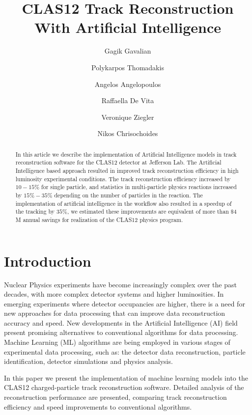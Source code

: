 \documentclass[preprint,12pt]{elsarticle}
\title{CLAS12 Track Reconstruction With Artificial Intelligence }
\author[1]{Gagik Gavalian}
\author[2]{Polykarpos Thomadakis}
\author[2]{Angelos Angelopoulos}
\author[3]{Raffaella De Vita}
\author[1]{Veronique Ziegler}
\author[2]{Nikos Chrisochoides}
\begin{document}
\begin{abstract}

  In this article we describe the implementation of Artificial Intelligence models in track reconstruction software for the CLAS12 detector at Jefferson Lab.
 The Artificial Intelligence based approach resulted in improved track reconstruction efficiency in high luminosity experimental conditions.  The track
 reconstruction efficiency increased by $10-15\%$ for single particle, and statistics in multi-particle physics reactions increased by $15\%-35\%$ depending 
 on the number of particles in the reaction. The implementation of artificial intelligence in the workflow also resulted in a speedup of the tracking by $35\%$, 
 we estimated these improvements are equivalent of more than $\$4$M  annual savings for realization of the CLAS12 physics program.
\end{abstract}
\maketitle


\section{Introduction}
\indent

Nuclear Physics experiments have become increasingly complex over the past decades, with more complex detector systems and higher luminosities. In emerging experiments where detector occupancies are higher, there is a need for new approaches for data processing that can improve data reconstruction accuracy and speed. New developments in the Artificial Intelligence (AI) field present promising alternatives to conventional algorithms for data processing. Machine Learning (ML) algorithms are being employed in various stages of experimental data processing, such as: the detector data reconstruction, particle identification, detector simulations and physics analysis. 

In this paper we present the implementation of machine learning models into the CLAS12 charged-particle track reconstruction software. Detailed analysis 
of the reconstruction performance are presented, comparing track reconstruction efficiency and speed improvements to conventional algorithms.





\end{document}
